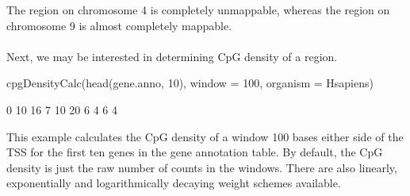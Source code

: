 \noindent The region on chromosome 4 is completely unmappable, whereas the region on chromosome 9 is almost completely mappable.
\ \\ \ \\
Next, we may be interested in determining CpG density of a region.

\begin{Schunk}
\begin{Sinput}
 cpgDensityCalc(head(gene.anno, 10), window = 100, organism = Hsapiens)
\end{Sinput}
\begin{Soutput}
 [1]  0 10 16  7 10 20  6  4  6  4
\end{Soutput}
\end{Schunk}

\noindent This example calculates the CpG density of a window 100 bases either side of the TSS for the first ten genes in the gene annotation table. By default, the CpG density is just the raw number of counts in the windows. There are also linearly, exponentially and logarithmically decaying weight schemes available.
